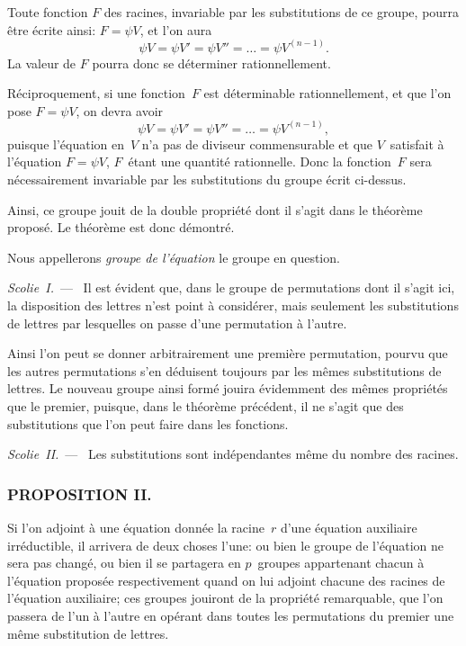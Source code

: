 \documentclass[leqno,12pt]{book}[2005/09/16]
\newcommand{\Subsection}[1]{\subsubsection*{\centering\small\normalfont #1}}
\newenvironment{MyEnvt}[2]{%
  \medskip\par
  \ifthenelse{\equal{#1}{}}{%
    \textsc{#2.}\ --- %
  }{%
    \textsc{#2 #1}\ --- %
  }%
  \itshape\ignorespaces
}{\medskip\normalfont}
\newenvironment{Theoreme}[1][]{\begin{MyEnvt}{#1}{Theorème}}{\end{MyEnvt}}
\newcommand{\Par}[1]{\medskip\par\textit{#1}\ ---\ \ignorespaces}
\let\Primo=\primo
\let\Secundo=\secundo
\renewcommand{\primo}{{\upshape\Primo}}
\renewcommand{\secundo}{{\upshape\Secundo}}
\begin{document}
\primo Toute fonction $F$ des racines, invariable par les substitutions
de ce groupe, pourra être écrite ainsi: $F = \psi V$, et l'on aura
\[
\psi V = \psi V' = \psi V'' = \dots = \psi V^{(n-1)}.
\]
La valeur de $F$ pourra donc se déterminer rationnellement.

\secundo Réciproquement, si une fonction~$F$ est déterminable rationnellement,
et que l'on pose $F = \psi V$, on devra avoir
\[
\psi V = \psi V' = \psi V'' = \dots = \psi V^{(n-1)},
\]
puisque l'équation en~$V$ n'a pas de diviseur commensurable et que
$V$~satisfait à l'équation $F = \psi V$, $F$~étant une quantité rationnelle.
Donc la fonction~$F$ sera nécessairement invariable par les substitutions
du groupe écrit ci-dessus.

Ainsi, ce groupe jouit de la double propriété dont il s'agit dans
le théorème proposé. Le théorème est donc démontré.

Nous appellerons \emph{groupe de l'équation} le groupe en question.

\Par{Scolie~\upshape I.} Il est évident que, dans le groupe de permutations
dont il s'agit ici, la disposition des lettres n'est point à considérer,
mais seulement les substitutions de lettres par lesquelles on passe
d'une permutation à l'autre.

Ainsi l'on peut se donner arbitrairement une première permutation,
pourvu que les autres permutations s'en déduisent toujours
par les mêmes substitutions de lettres. Le nouveau groupe ainsi
formé jouira évidemment des mêmes propriétés que le premier,
puisque, dans le théorème précédent, il ne s'agit que des substitutions
que l'on peut faire dans les fonctions.

\Par{Scolie~\upshape II.} Les substitutions sont indépendantes même du
nombre des racines.

\Subsection{PROPOSITION II.}

\begin{Theoreme}[\protect\footnotemark.]
Si l'on adjoint à une équation donnée la
racine~$r$ d'une équation auxiliaire irréductible, \primo il arrivera
de deux choses l'une: ou bien le groupe de l'équation ne sera
pas changé, ou bien il se partagera en $p$~groupes appartenant
chacun à l'équation proposée respectivement quand on lui adjoint
chacune des racines de l'équation auxiliaire; \secundo ces
groupes jouiront de la propriété remarquable, que l'on passera
de l'un à l'autre en opérant dans toutes les permutations du
premier une même substitution de lettres.
\end{Theoreme}
\end{document}
